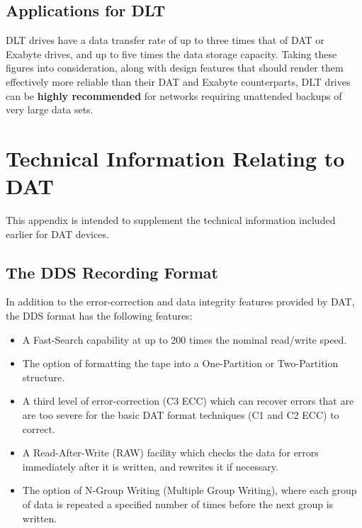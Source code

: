 \subsection {Applications for DLT}

DLT drives have a data transfer rate of up to three times that of DAT or
Exabyte drives, and up to five times the data storage capacity. Taking these
figures into consideration, along with design features that should render
them effectively more reliable than their DAT and Exabyte counterparts, DLT
drives can be {\bf highly recommended} for networks requiring unattended
backups of very large data sets.

\clearpage

\appendix

\section {Technical Information Relating to DAT}

This appendix is intended to supplement the technical information included
earlier for DAT devices.

\subsection {The DDS Recording Format}

In addition to the error-correction and data integrity features provided by
DAT, the DDS format has the following features:

\begin {itemize}

\item A Fast-Search capability at up to 200 times the nominal read/write
speed.

\item The option of formatting the tape into a One-Partition or Two-Partition
structure.

\item A third level of error-correction (C3 ECC) which can recover errors
that are are too severe for the basic DAT format techniques (C1 and C2 ECC)
to correct.

\item A Read-After-Write (RAW) facility which checks the data for errors
immediately after it is written, and rewrites it if necessary.

\item The option of N-Group Writing (Multiple Group Writing), where each
group of data is repeated a specified number of times before the next group
is written.

\end {itemize}

